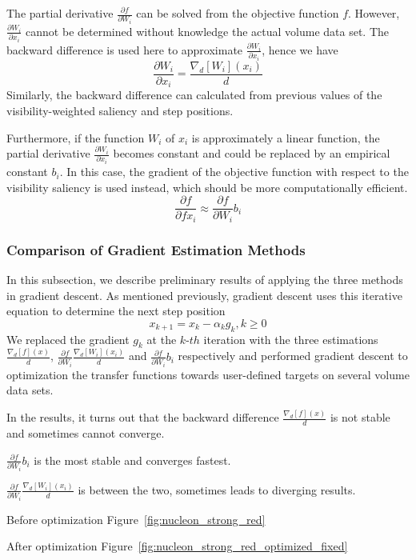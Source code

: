 The partial derivative $ \frac{\partial f}{\partial W_{i}} $ can be solved from the objective function $ f $. However, $ \frac{\partial W_{i}}{\partial x_{i}} $ cannot be determined without knowledge the actual volume data set. The backward difference is used here to approximate $ \frac{\partial W_{i}}{\partial x_{i}} $, hence we have
\[ \frac{\partial W_{i}}{\partial x_{i}} = \frac{\nabla_{d}[W_{i}](x_{i})}{d} \]
Similarly, the backward difference can calculated from previous values of the visibility-weighted saliency and step positions.

Furthermore, if the function $ W_{i} $ of $ x_{i} $ is approximately a linear function, the partial derivative $ \frac{\partial W_{i}}{\partial x_{i}} $ becomes constant and could be replaced by an empirical constant $ b_{i} $. In this case, the gradient of the objective function with respect to the visibility saliency is used instead, which should be more computationally efficient.
\[ \frac{\partial f}{\partial f x_{i}} \approx \frac{\partial f}{\partial W_{i}} b_{i} \]

\subsubsection{Comparison of Gradient Estimation Methods}
In this subsection, we describe preliminary results of applying the three methods in gradient descent.
As mentioned previously, gradient descent uses this iterative equation to determine the next step position
\[ x_{k+1}=x_{k}- \alpha_{k} g_{k} , k \geq 0 \]
We replaced the gradient $ g_{k} $ at the $ k $-$ th $ iteration with the three estimations
$ \frac{\nabla_{d}[f](x)}{d} $,
$ \frac{\partial f}{\partial W_{i}} \frac{\nabla_{d}[W_{i}](x_{i})}{d} $ and
$ \frac{\partial f}{\partial W_{i}} b_{i} $ respectively and performed gradient descent to optimization the transfer functions towards user-defined targets on several volume data sets.

In the results, it turns out that the backward difference $ \frac{\nabla_{d}[f](x)}{d} $ is not stable and sometimes cannot converge.

$ \frac{\partial f}{\partial W_{i}} b_{i} $ is the most stable and converges fastest.

$ \frac{\partial f}{\partial W_{i}} \frac{\nabla_{d}[W_{i}](x_{i})}{d} $ is between the two, sometimes leads to diverging results.

Before optimization
Figure~\ref{fig:nucleon_strong_red}

After optimization
Figure~\ref{fig:nucleon_strong_red_optimized_fixed}

